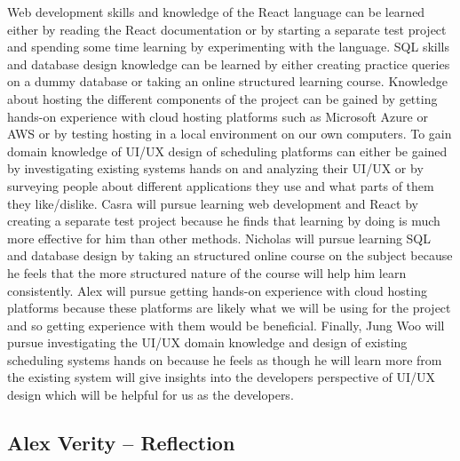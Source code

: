 \documentclass[12pt]{article}
\begin{document}
\begin{enumerate}
  Web development skills and knowledge of the React language can be learned either by reading 
  the React documentation or by starting a separate test project and spending some time 
  learning by experimenting with the language. SQL skills and database design knowledge can 
  be learned by either creating practice queries on a dummy database or taking an online 
  structured learning course. Knowledge about hosting the different components of the project 
  can be gained by getting hands-on experience with cloud hosting platforms such as Microsoft 
  Azure or AWS or by testing hosting in a local environment on our own computers. To gain 
  domain knowledge of UI/UX design of scheduling platforms can either be gained by 
  investigating existing systems hands on and analyzing their UI/UX or by surveying people 
  about different applications they use and what parts of them they like/dislike.
  Casra will pursue learning web development and React by creating a separate test project 
  because he finds that learning by doing is much more effective for him than other methods. 
  Nicholas will pursue learning SQL and database design by taking an structured online course 
  on the subject because he feels that the more structured nature of the course will help him 
  learn consistently. Alex will pursue getting hands-on experience with cloud hosting 
  platforms because these platforms are likely what we will be using for the project and 
  so getting experience with them would be beneficial. Finally, Jung Woo will pursue 
  investigating the UI/UX domain knowledge and design of existing scheduling systems hands 
  on because he feels as though he will learn more from the existing system will give 
  insights into the developers perspective of UI/UX design which will be helpful for us as 
  the developers.

\end{enumerate}

\subsection*{Alex Verity -- Reflection}
\end{document}
